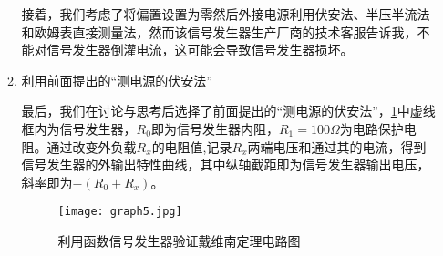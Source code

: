 \documentclass[dvipsnames, svgnames,a4paper,11pt]{article}
\begin{document}
\begin{enumerate}
\begin{enumerate}
				接着，我们考虑了将偏置设置为零然后外接电源利用伏安法、半压半流法和欧姆表直接测量法，然而该信号发生器生产厂商的技术客服告诉我，不能对信号发生器倒灌电流，这可能会导致信号发生器损坏。
				
				\item 利用前面提出的“测电源的伏安法”
				
				最后，我们在讨论与思考后选择了前面提出的“测电源的伏安法”，\cref{fig:graph5}中虚线框内为信号发生器，$R_0$即为信号发生器内阻，$R_1=100\Omega$为电路保护电阻。通过改变外负载$R_x$的电阻值,记录$R_x$两端电压和通过其的电流，得到信号发生器的外输出特性曲线，其中纵轴截距即为信号发生器输出电压，斜率即为$-(R_0+R_x)$。
				
				\begin{figure}[htbp]
					\centering
					\texttt{[image: graph5.jpg]}
					\caption{利用函数信号发生器验证戴维南定理电路图}
					\label{fig:graph5}
				\end{figure}
																
			\end{enumerate}
	\end{enumerate}
	
\end{document}
